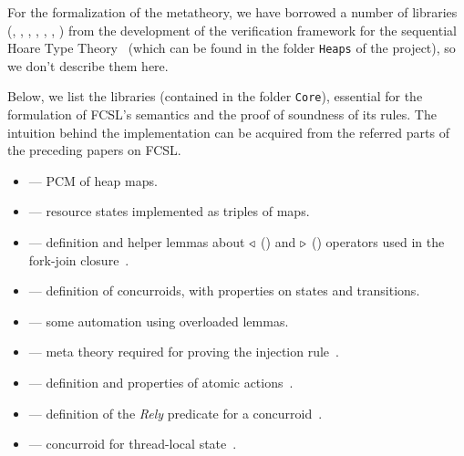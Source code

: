 For the formalization of the metatheory, we have borrowed a number of
libraries (, , ,
, , , ) from
the development of the verification framework for the sequential Hoare
Type Theory~\cite{Nanevski-al:POPL10} (which can be found in the
folder \texttt{Heaps} of the project), so we don't describe them here.

Below, we list the libraries (contained in the folder \texttt{Core}),
essential for the formulation of FCSL's semantics and the proof of
soundness of its rules. The intuition behind the implementation can be
acquired from the referred parts of the preceding papers on FCSL.


\begin{itemize}

\item {} --- PCM of heap maps.

\item {} --- resource states implemented as triples of maps.

\item {} --- definition and helper lemmas about $\triangleleft$
  (\code{<\\}) and $\triangleright$ (\code{/>}) operators used in the fork-join
  closure~\cite{Nanevski-al:ESOP14}.

\item {} --- definition of concurroids, with properties on
  states and transitions. %

\item {} --- some automation using overloaded
    lemmas.

\item {} --- meta theory required for proving the
    injection rule~\cite{Nanevski-al:ESOP14}.
                       
\item{} --- definition and properties of atomic actions~\cite[Appendix A]{Nanevski-al:ESOP14}.

\item{} --- definition of the \emph{Rely} predicate for a
  concurroid~\cite[Appendix~B]{Nanevski-al:ESOP14}.

\item {} --- concurroid for thread-local
  state~\cite[\S 4,~Example~1]{Nanevski-al:ESOP14}. %


\end{itemize}
